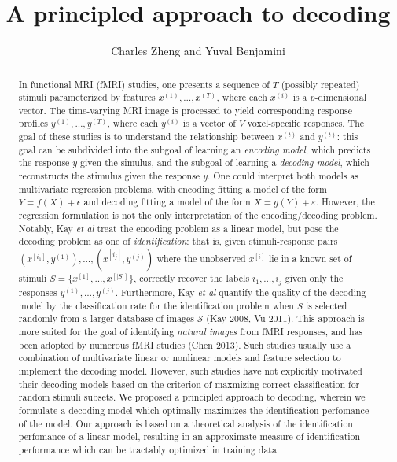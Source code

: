\documentclass[11pt]{article}
\begin{document}
\newcommand{\tr}{\text{tr}}
\newcommand{\E}{\textbf{E}}
\newcommand{\diag}{\text{diag}}
\newcommand{\argmax}{\text{argmax}}
\newcommand{\Cov}{\text{Cov}}
\pagestyle{fancy}

\title{A principled approach to decoding}

\author{Charles Zheng and Yuval Benjamini}

\maketitle

\begin{abstract}
In functional MRI (fMRI) studies, one presents a sequence of $T$
(possibly repeated) stimuli parameterized by features $x^{(1)},
\hdots, x^{(T)}$, where each $x^{(i)}$ is a $p$-dimensional vector.
The time-varying MRI image is processed to yield corresponding
response profiles $y^{(1)}, \hdots, y^{(T)}$, where each $y^{(i)}$ is
a vector of $V$ voxel-specific responses.  The goal of these studies
is to understand the relationship between $x^{(t)}$ and $y^{(t)}$: this goal can
be subdivided into the subgoal of learning an \emph{encoding model},
which predicts the response $y$ given the simulus, and the subgoal of
learning a \emph{decoding model}, which reconstructs the stimulus
given the response $y$.  One could interpret both models as
multivariate regression problems, with encoding fitting a model of the
form $Y = f(X) + \epsilon$ and decoding fitting a model of the form $X
= g(Y) + \varepsilon$.  However, the regression formulation is not the
only interpretation of the encoding/decoding problem.  Notably, Kay
\emph{et al} treat the encoding problem as a linear model, but pose
the decoding problem as one of \emph{identification}: that is, given
stimuli-response pairs $(x^{[i_1]}, y^{(1)}), \hdots, (x^{[i_j]},
y^{(j)})$ where the unobserved $x^{[i]}$ lie in a known set of stimuli
$S = \{x^{[1]},\hdots, x^{[|S|]}\}$, correctly recover the labels
$i_1,\hdots, i_j$ given only the responses $y^{(1)}, \hdots, y^{(j)}$.
Furthermore, Kay \emph{et al} quantify the quality of the decoding
model by the classification rate for the identification problem when
$S$ is selected randomly from a larger database of images
$\mathcal{S}$ (Kay 2008, Vu 2011).  This approach is more suited for
the goal of identifying \emph{natural images} from fMRI responses, and
has been adopted by numerous fMRI studies (Chen 2013). Such studies
usually use a combination of multivariate linear or nonlinear models
and feature selection to implement the decoding model.  However, such
studies have not explicitly motivated their decoding models based on
the criterion of maxmizing correct classification for random stimuli
subsets.  We proposed a principled approach to decoding, wherein we
formulate a decoding model which optimally maximizes the
identification perfomance of the model.  Our approach is based on a
theoretical analysis of the identification perfomance of a linear
model, resulting in an approximate measure of identification
performance which can be tractably optimized in training data.
\end{abstract}
\end{document}
